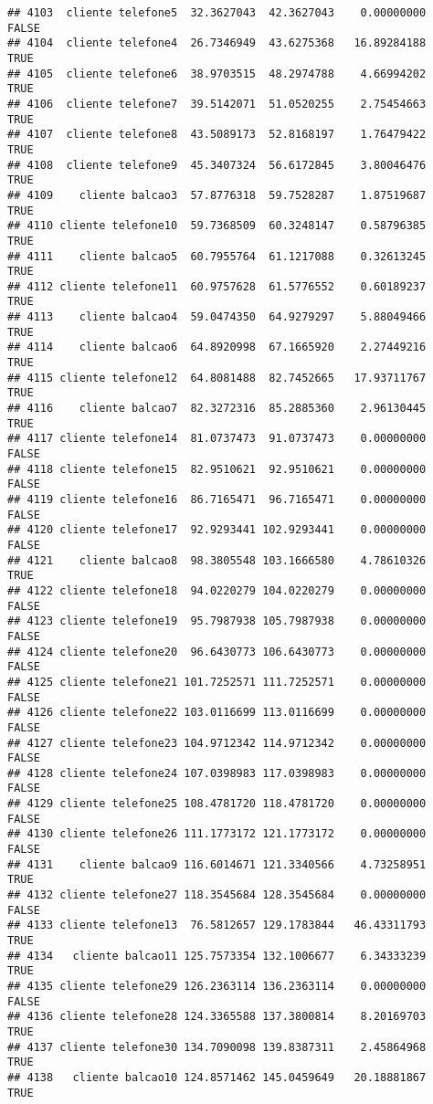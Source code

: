 \documentclass[
]{article}
\begin{document}
\begin{verbatim}
## 4103  cliente telefone5  32.3627043  42.3627043    0.00000000    FALSE
## 4104  cliente telefone4  26.7346949  43.6275368   16.89284188     TRUE
## 4105  cliente telefone6  38.9703515  48.2974788    4.66994202     TRUE
## 4106  cliente telefone7  39.5142071  51.0520255    2.75454663     TRUE
## 4107  cliente telefone8  43.5089173  52.8168197    1.76479422     TRUE
## 4108  cliente telefone9  45.3407324  56.6172845    3.80046476     TRUE
## 4109    cliente balcao3  57.8776318  59.7528287    1.87519687     TRUE
## 4110 cliente telefone10  59.7368509  60.3248147    0.58796385     TRUE
## 4111    cliente balcao5  60.7955764  61.1217088    0.32613245     TRUE
## 4112 cliente telefone11  60.9757628  61.5776552    0.60189237     TRUE
## 4113    cliente balcao4  59.0474350  64.9279297    5.88049466     TRUE
## 4114    cliente balcao6  64.8920998  67.1665920    2.27449216     TRUE
## 4115 cliente telefone12  64.8081488  82.7452665   17.93711767     TRUE
## 4116    cliente balcao7  82.3272316  85.2885360    2.96130445     TRUE
## 4117 cliente telefone14  81.0737473  91.0737473    0.00000000    FALSE
## 4118 cliente telefone15  82.9510621  92.9510621    0.00000000    FALSE
## 4119 cliente telefone16  86.7165471  96.7165471    0.00000000    FALSE
## 4120 cliente telefone17  92.9293441 102.9293441    0.00000000    FALSE
## 4121    cliente balcao8  98.3805548 103.1666580    4.78610326     TRUE
## 4122 cliente telefone18  94.0220279 104.0220279    0.00000000    FALSE
## 4123 cliente telefone19  95.7987938 105.7987938    0.00000000    FALSE
## 4124 cliente telefone20  96.6430773 106.6430773    0.00000000    FALSE
## 4125 cliente telefone21 101.7252571 111.7252571    0.00000000    FALSE
## 4126 cliente telefone22 103.0116699 113.0116699    0.00000000    FALSE
## 4127 cliente telefone23 104.9712342 114.9712342    0.00000000    FALSE
## 4128 cliente telefone24 107.0398983 117.0398983    0.00000000    FALSE
## 4129 cliente telefone25 108.4781720 118.4781720    0.00000000    FALSE
## 4130 cliente telefone26 111.1773172 121.1773172    0.00000000    FALSE
## 4131    cliente balcao9 116.6014671 121.3340566    4.73258951     TRUE
## 4132 cliente telefone27 118.3545684 128.3545684    0.00000000    FALSE
## 4133 cliente telefone13  76.5812657 129.1783844   46.43311793     TRUE
## 4134   cliente balcao11 125.7573354 132.1006677    6.34333239     TRUE
## 4135 cliente telefone29 126.2363114 136.2363114    0.00000000    FALSE
## 4136 cliente telefone28 124.3365588 137.3800814    8.20169703     TRUE
## 4137 cliente telefone30 134.7090098 139.8387311    2.45864968     TRUE
## 4138   cliente balcao10 124.8571462 145.0459649   20.18881867     TRUE

\end{verbatim}
\end{document}
